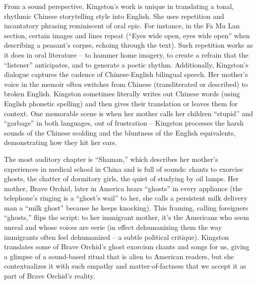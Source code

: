 \documentclass[12pt]{report}
\begin{document}
From a sound perspective, Kingston’s work is unique in translating a tonal, rhythmic Chinese storytelling style into English. She uses repetition and incantatory phrasing reminiscent of oral epic. For instance, in the Fa Mu Lan section, certain images and lines repeat (“Eyes wide open, eyes wide open” when describing a peasant’s corpse, echoing through the text). Such repetition works as it does in oral literature – to hammer home imagery, to create a refrain that the “listener” anticipates, and to generate a poetic rhythm. Additionally, Kingston’s dialogue captures the cadence of Chinese-English bilingual speech. Her mother’s voice in the memoir often switches from Chinese (transliterated or described) to broken English. Kingston sometimes literally writes out Chinese words (using English phonetic spelling) and then gives their translation or leaves them for context. One memorable scene is when her mother calls her children “stupid” and “garbage” in both languages, out of frustration – Kingston processes the harsh sounds of the Chinese scolding and the bluntness of the English equivalents, demonstrating how they hit her ears. 

The most auditory chapter is “Shaman,” which describes her mother’s experiences in medical school in China and is full of sounds: chants to exorcise ghosts, the chatter of dormitory girls, the quiet of studying by oil lamps. Her mother, Brave Orchid, later in America hears “ghosts” in every appliance (the telephone’s ringing is a “ghost’s wail” to her, she calls a persistent milk delivery man a “milk ghost” because he keeps knocking). This framing, calling foreigners “ghosts,” flips the script: to her immigrant mother, it’s the Americans who seem unreal and whose voices are eerie (in effect dehumanizing them the way immigrants often feel dehumanized – a subtle political critique). Kingston translates some of Brave Orchid’s ghost exorcism chants and songs for us, giving a glimpse of a sound-based ritual that is alien to American readers, but she contextualizes it with such empathy and matter-of-factness that we accept it as part of Brave Orchid’s reality.
\end{document}
